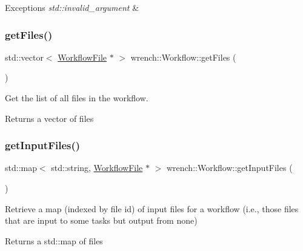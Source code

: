 \begin{DoxyExceptions}{Exceptions}
{\em std\+::invalid\+\_\+argument} & \\
\hline
\end{DoxyExceptions}
\mbox{\label{classwrench_1_1_workflow_ab6754d68d09294e56aaffbe75c891369}} 
\subsubsection{\texorpdfstring{get\+Files()}{getFiles()}}
{\footnotesize\ttfamily std\+::vector$<$ \hyperlink{classwrench_1_1_workflow_file}{Workflow\+File} $\ast$ $>$ wrench\+::\+Workflow\+::get\+Files (\begin{DoxyParamCaption}{ }\end{DoxyParamCaption})}



Get the list of all files in the workflow. 

\begin{DoxyReturn}{Returns}
a vector of files 
\end{DoxyReturn}
\mbox{\label{classwrench_1_1_workflow_aa0b88cee8316ed20def3010c92a6d69c}} 
\subsubsection{\texorpdfstring{get\+Input\+Files()}{getInputFiles()}}
{\footnotesize\ttfamily std\+::map$<$ std\+::string, \hyperlink{classwrench_1_1_workflow_file}{Workflow\+File} $\ast$ $>$ wrench\+::\+Workflow\+::get\+Input\+Files (\begin{DoxyParamCaption}{ }\end{DoxyParamCaption})}



Retrieve a map (indexed by file id) of input files for a workflow (i.\+e., those files that are input to some tasks but output from none) 

\begin{DoxyReturn}{Returns}
a std\+::map of files 
\end{DoxyReturn}
\mbox{\label{classwrench_1_1_workflow_ab2b98a21d67824c2fc17cdc71c7e3909}} 
